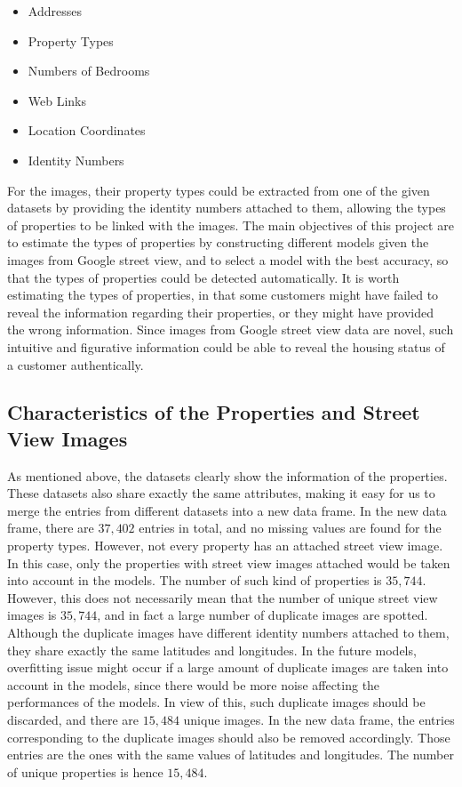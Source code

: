 \documentclass[11pt,twoside]{article}
\numberwithin{Theorem}{section}
\numberwithin{Definition}{section}
\numberwithin{Lemma}{section}
\numberwithin{Algorithm}{section}
\numberwithin{equation}{section}
\begin{document}
\begin{itemize}
    \item Addresses
\item Property Types
\item Numbers of Bedrooms
\item Web Links
\item Location Coordinates
\item Identity Numbers
\end{itemize}






For the images, their property types could be extracted from one of the given datasets by providing the identity numbers attached to them, allowing the types of properties to be linked with the images. The main objectives of this project are to estimate the types of properties by constructing different models given the images from Google street view, and to select a model with the best accuracy, so that the types of properties could be detected automatically. It is worth estimating the types of properties, in that some customers might have failed to reveal the information regarding their properties, or they might have provided the wrong information. Since images from Google street view data are novel, such intuitive and figurative information could be able to reveal the housing status of a customer authentically.

\subsection{Characteristics of the Properties and Street View Images}
As mentioned above, the datasets clearly show the information of the properties. These datasets also share exactly the same attributes, making it easy for us to merge the entries from different datasets into a new data frame. In the new data frame, there are $37,402$ entries in total, and no missing values are found for the property types. However, not every property has an attached street view image. In this case, only the properties with street view images attached would be taken into account in the models. The number of such kind of properties is $35,744$. However, this does not necessarily mean that the number of unique street view images is $35,744$, and in fact a large number of duplicate images are spotted. Although the duplicate images have different identity numbers attached to them, they share exactly the same latitudes and longitudes. In the future models, overfitting issue might occur if a large amount of duplicate images are taken into account in the models, since there would be more noise affecting the performances of the models. In view of this, such duplicate images should be discarded, and there are $15,484$ unique images. In the new data frame, the entries corresponding to the duplicate images should also be removed accordingly. Those entries are the ones with the same values of latitudes and longitudes. The number of unique properties is hence $15,484$.
\end{document}
